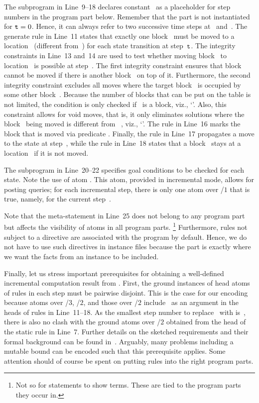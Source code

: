 The  subprogram in Line~9--18 declares constant~ as a placeholder for step numbers in the program part below.
Remember that the  part is not instantiated for $\texttt{t}=0$.
Hence, it can always refer to two successive time steps at~ and~.
The generate rule in Line~11 states that exactly one block~ must be moved to a location~ (different from~) 
for each state transition at step~$\texttt{t}$.
The integrity constraints in Line~13 and~14 are used to test whether moving block~ to location~ is possible at step~.
The first integrity constraint ensures that block~ cannot be moved if there is another block~ on top of it.
Furthermore, the second integrity constraint excludes all moves where the target block~ is occupied by some other block~.
Because the number of blocks that can be put on the table is not limited, the condition is only checked if~ is a block, viz., `'.
Also, this constraint allows for void moves, that is,
it only eliminates solutions where the block~ being moved is different from ~, viz., `'.
The rule in Line~16 marks the block that is moved via predicate .
Finally, the rule in Line~17 propagates a move to the state at step~,
while the rule in Line~18 states
that a block~ stays at a location~ if it is not moved.

The subprogram  in Line~20--22 specifies goal conditions to be checked for each state.
Note the use of atom .
This atom, provided in incremental mode,
allows for posting queries;
for each incremental step, there is only one atom over /$1$ that is true,
namely,  for the current step~.

Note that the  meta-statement in Line~25 does not belong to any program part
but affects the visibility of atoms in all program parts.%
\footnote{Not so for  statements to show terms.
These are tied to the program parts they occur in.}
Furthermore, rules not subject to a  directive are associated with the  program by default.
Hence, we do not have to use such directives in instance files
because the  part is exactly where we want the facts from an instance to be
included.

Finally, let us stress important prerequisites for obtaining
a well-defined incremental computation result from \clingo.
First, the ground instances of head atoms of rules in each step must be pairwise disjoint.
This is the case for our encoding because atoms over /$3$, /$2$,
and those over /$2$ include~ as an argument in the heads of rules in Line~11--18.
As the smallest step number to replace~ with is~,
there is also no clash with the ground atoms over /$2$
obtained from the head of the static rule in Line~7.
Further details on the sketched requirements and their formal background can be found in~\cite{gekakaosscth08a}.
Arguably, many problems including a mutable bound can be encoded such that this prerequisite applies.
Some attention should of course be spent on putting rules into the right program parts.

